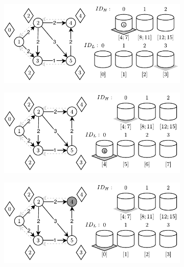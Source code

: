 \begin{figure}[!htbp]
\begin{subfigure}[b]{0.45\textwidth}
		\includegraphics[width=\textwidth]{Chapter_II/DOUBLE-LEVEL-BUCKET-Example/e.pdf}
		\caption{}
	\end{subfigure}
	\begin{subfigure}[b]{0.45\textwidth}
		\includegraphics[width=\textwidth]{Chapter_II/DOUBLE-LEVEL-BUCKET-Example/f.pdf}
		\caption{}
	\end{subfigure}
	\qquad
	\begin{subfigure}[b]{0.45\textwidth}
		\includegraphics[width=\textwidth]{Chapter_II/DOUBLE-LEVEL-BUCKET-Example/g.pdf}
		\caption{}
	\end{subfigure}%

\end{figure}
